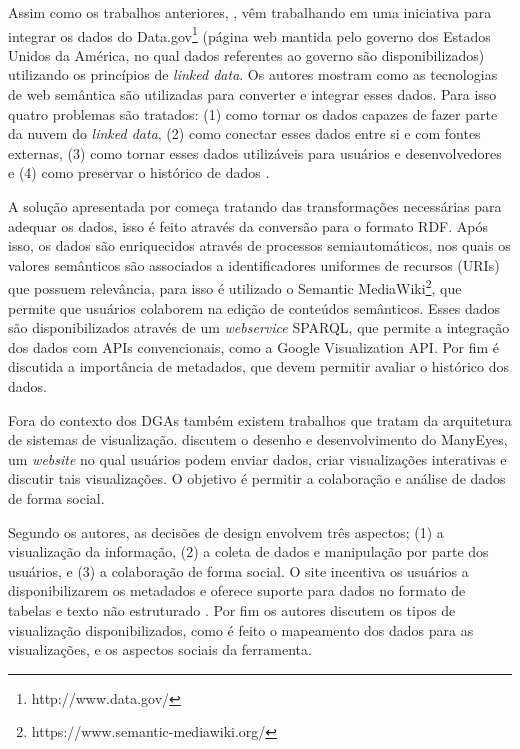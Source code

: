 Assim como os trabalhos anteriores, , vêm trabalhando em uma 
iniciativa para integrar os dados do Data.gov\footnote{ http://www.data.gov/} (página web 
mantida pelo governo dos Estados Unidos da América, no qual dados referentes ao governo são 
disponibilizados) utilizando os princípios de \textit{linked data}. Os autores mostram como 
as tecnologias de web semântica são utilizadas para converter e integrar esses dados. Para 
isso quatro problemas são tratados: (1) como tornar os dados capazes de fazer parte da 
nuvem do \textit{linked data}, (2) como conectar esses dados entre si e com fontes externas, 
(3) como tornar esses dados utilizáveis para usuários e desenvolvedores e (4) como preservar 
o histórico de dados \cite{ding2010data}.

A solução apresentada por  começa tratando das transformações 
necessárias para adequar os dados, isso é feito através da conversão para o formato RDF. 
Após isso, os dados são enriquecidos através de processos semiautomáticos, nos quais os valores 
semânticos são associados a identificadores uniformes de recursos (URIs) que possuem 
relevância, para isso é utilizado o Semantic MediaWiki\footnote{https://www.semantic-mediawiki.org/}, 
que permite que usuários colaborem na edição de conteúdos semânticos. Esses dados são 
disponibilizados através de um \textit{webservice} SPARQL, que permite a integração dos dados 
com APIs convencionais, como a Google Visualization API. Por fim é discutida a importância de 
metadados, que devem permitir avaliar o histórico dos dados.

Fora do contexto dos DGAs também existem trabalhos que tratam da arquitetura de sistemas de 
visualização.  discutem o desenho e desenvolvimento do ManyEyes, um 
\textit{website} no qual usuários podem enviar dados, criar visualizações interativas e 
discutir tais visualizações. O objetivo é permitir a colaboração e análise de dados de forma 
social.

Segundo os autores, as decisões de design envolvem três aspectos; (1) a visualização da 
informação, (2) a coleta de dados e manipulação por parte dos usuários, e (3) a colaboração 
de forma social. O site incentiva os usuários a disponibilizarem os metadados e oferece 
suporte para dados no formato de tabelas e texto não estruturado \cite{viegas2007}. 
Por fim os autores discutem os tipos de visualização disponibilizados, como é feito o 
mapeamento dos dados para as visualizações, e os aspectos sociais da ferramenta.

